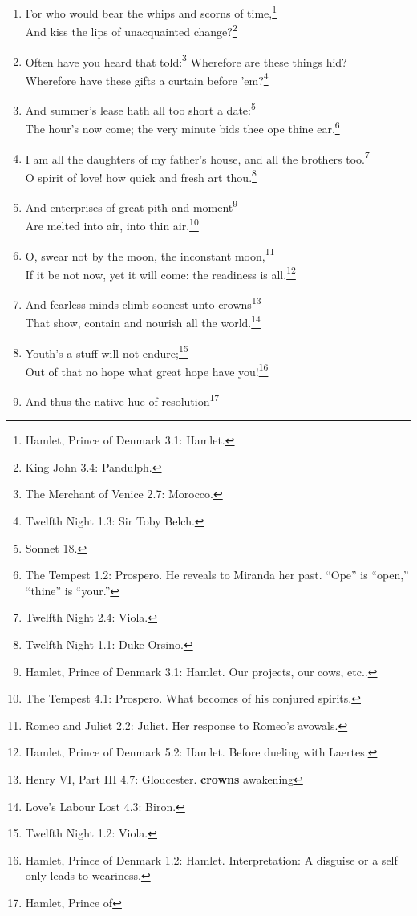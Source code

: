\documentclass[17pt,twoside]{extarticle}
\begin{document}
\begin{enumerate}
{    Theseus.}
\item
  For who would bear the whips and scorns of time,\footnote{Hamlet,
    Prince of Denmark 3.1: Hamlet.}\\And kiss the lips of unacquainted
  change?\footnote{King John 3.4: Pandulph.}
\item
  Often have you heard that told:\footnote{The Merchant of Venice 2.7:
    Morocco.} Wherefore are these things hid?\\Wherefore have these
  gifts a curtain before 'em?\footnote{Twelfth Night 1.3: Sir Toby
    Belch.}
\item
  And summer's lease hath all too short a date:\footnote{Sonnet 18.}\\The
  hour's now come; the very minute bids thee ope thine ear.\footnote{The
    Tempest 1.2: Prospero. He reveals to Miranda her past. ``Ope'' is
    ``open,'' ``thine'' is ``your.''}
\item
  I am all the daughters of my father's house, and all the brothers
  too.\footnote{Twelfth Night 2.4: Viola.}\\O spirit of love! how quick
  and fresh art thou.\footnote{Twelfth Night 1.1: Duke Orsino.}
\item
  And enterprises of great pith and moment\footnote{Hamlet, Prince of
    Denmark 3.1: Hamlet. Our projects, our cows, etc..}\\Are melted into
  air, into thin air.\footnote{The Tempest 4.1: Prospero. What becomes
    of his conjured spirits.}
\item
  O, swear not by the moon, the inconstant moon,\footnote{Romeo and
    Juliet 2.2: Juliet. Her response to Romeo's avowals.}\\If it be not
  now, yet it will come: the readiness is all.\footnote{Hamlet, Prince
    of Denmark 5.2: Hamlet. Before dueling with Laertes.}
\item
  And fearless minds climb soonest unto crowns\footnote{Henry VI, Part
    III 4.7: Gloucester. \textbf{crowns} awakening}\\That show, contain
  and nourish all the world.\footnote{Love's Labour Lost 4.3: Biron.}
\item
  Youth's a stuff will not endure;\footnote{Twelfth Night 1.2: Viola.}\\Out
  of that no hope what great hope have you!\footnote{Hamlet, Prince of
    Denmark 1.2: Hamlet. Interpretation: A disguise or a self only leads
    to weariness.}
\item
  And thus the native hue of resolution\footnote{Hamlet, Prince of
}
\end{enumerate}
\end{document}
